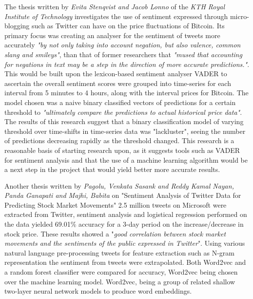 \documentclass[oneside, 12pt]{article}
\begin{document}
		The thesis written by \textit{Evita Stenqvist and Jacob Lonno} of the \textit{KTH Royal Institute of Technology} \cite{BTCFTsent} investigates the use of sentiment expressed through micro-blogging such as Twitter can have on the price fluctuations of Bitcoin. Its primary focus was creating an analyser for the sentiment of tweets more accurately \textit{"by not only taking into account negation, but also valence, common slang and smileys"}, than that of former researchers that \textit{"mused that accounting for negations in text may be a step in the direction of more accurate predictions."}. This would be built upon the lexicon-based sentiment analyser VADER to ascertain the overall sentiment scores were grouped into time-series for each interval from 5 minutes to 4 hours, along with the interval prices for Bitcoin. The model chosen was a naive binary classified vectors of predictions for a certain threshold to \textit{"ultimately compare the predictions to actual historical price data"}. The results of this research suggest that a binary classification model of varying threshold over time-shifts in time-series data was "lackluster", seeing the number of predictions decreasing rapidly as the threshold changed. This research is a reasonable basis of starting research upon, as it suggests tools such as VADER for sentiment analysis and that the use of a machine learning algorithm would be a next step in the project that would yield better more accurate results.
		
		Another thesis written by \textit{Pagolu, Venkata Sasank and Reddy Kamal Nayan, Panda Ganapati and Majhi, Babita} \cite{SaTdpsmm} on "Sentiment Analysis of Twitter Data for Predicting Stock Market Movements" 2.5 million tweets on Microsoft were extracted from Twitter, sentiment analysis and logistical regression performed on the data yielded 69.01\% accuracy for a 3-day period on the increase/decrease in stock price. These results showed a "\textit{good correlation between stock market movements and the sentiments of the public expressed in Twitter}". Using various natural language pre-processing tweets for feature extraction such as N-gram representation the sentiment from tweets were extrapolated. Both Word2vec and a random forest classifier were compared for accuracy, Word2vec being chosen over the machine learning model. Word2vec, being a group of related shallow two-layer neural network models to produce word embeddings.
		
\end{document}
